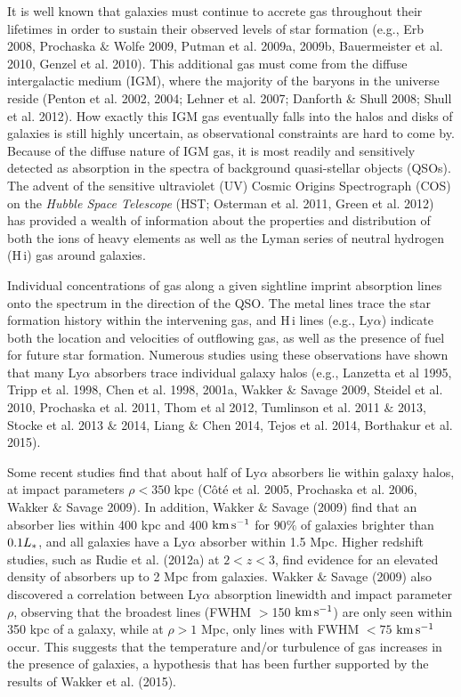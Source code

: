 \documentclass[twocolumn,tighten]{aastex6}
\begin{document}
It is well known that galaxies must continue to accrete gas throughout their lifetimes in order to sustain their observed levels of star formation (e.g., Erb 2008, Prochaska $\&$ Wolfe 2009, Putman et al. 2009a, 2009b, Bauermeister et al. 2010, Genzel et al. 2010). This additional gas must come from the diffuse intergalactic medium (IGM), where the majority of the baryons in the universe reside (Penton et al. 2002, 2004; Lehner et al. 2007; Danforth $\&$ Shull 2008; Shull et al. 2012). How exactly this IGM gas eventually falls into the halos and disks of galaxies is still highly uncertain, as observational constraints are hard to come by. Because of the diffuse nature of IGM gas, it is most readily and sensitively detected as absorption in the spectra of background quasi-stellar objects (QSOs). The advent of the sensitive ultraviolet (UV) Cosmic Origins Spectrograph (COS) on the \textit{Hubble Space Telescope} (HST; Osterman et al. 2011, Green et al. 2012) has provided a wealth of information about the properties and distribution of both the ions of heavy elements as well as the Lyman series of neutral hydrogen (H\,{\sc i}) gas around galaxies. 

Individual concentrations of gas along a given sightline imprint absorption lines onto the spectrum in the direction of the QSO. The metal lines trace the star formation history within the intervening gas, and H\,{\sc i} lines (e.g., Ly$\alpha$) indicate both the location and velocities of outflowing gas, as well as the presence of fuel for future star formation. Numerous studies using these observations have shown that many Ly$\alpha$ absorbers trace individual galaxy halos (e.g., Lanzetta et al 1995, Tripp et al. 1998, Chen et al. 1998, 2001a, Wakker $\&$ Savage 2009, Steidel et al. 2010, Prochaska et al. 2011, Thom et al 2012, Tumlinson et al. 2011 $\&$ 2013, Stocke et al. 2013 $\&$ 2014, Liang $\&$ Chen 2014, Tejos et al. 2014, Borthakur et al. 2015).

Some recent studies find that about half of Ly$\alpha$ absorbers lie within galaxy halos, at impact parameters $\rho<350$ kpc (C\^{o}t\'{e} et al. 2005, Prochaska et al. 2006, Wakker $\&$ Savage 2009). In addition, Wakker $\&$ Savage (2009) find that an absorber lies within 400 kpc and 400 $\rm km\, s^{-1}$ for $90\%$ of galaxies brighter than $0.1L_{\**}$, and all galaxies have a Ly$\alpha$ absorber within 1.5 Mpc. Higher redshift studies, such as Rudie et al. (2012a) at $2<z<3$, find evidence for an elevated density of absorbers up to 2 Mpc from galaxies. Wakker $\&$ Savage (2009) also discovered a correlation between Ly$\alpha$ absorption linewidth and impact parameter $\rho$, observing that the broadest lines (FWHM $>$150 $\rm km\, s^{-1}$) are only seen within 350 kpc of a galaxy, while at $\rho>1$ Mpc, only lines with FWHM $<75$ $\rm km\, s^{-1}$ occur. This suggests that the temperature and/or turbulence of gas increases in the presence of galaxies, a hypothesis that has been further supported by the results of Wakker et al. (2015). 
\end{document}
